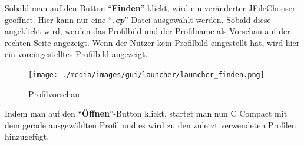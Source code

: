 Sobald man auf den Button "`\textbf{Finden}"' klickt, wird ein veränderter JFileChooser geöffnet. Hier kann nur eine "`\textit{\textbf{.cp}}"' Datei ausgewählt werden. Sobald diese angeklickt wird, werden das Profilbild und der Profilname als Vorschau auf der rechten Seite angezeigt. Wenn der Nutzer kein Profilbild eingestellt hat, wird hier ein voreingestelltes Profilbild angezeigt.

\begin{figure}[h] 
   \centering
     \texttt{[image: ./media/images/gui/launcher/launcher\_finden.png]}
  \caption{ Profilvorschau}
  \label{fig:Bild1}
\end{figure}

Indem man auf den "`\textbf{Öffnen}"'-Button klickt, startet man nun C Compact mit dem gerade ausgewählten Profil und es wird zu den zuletzt verwendeten Profilen hinzugefügt.
